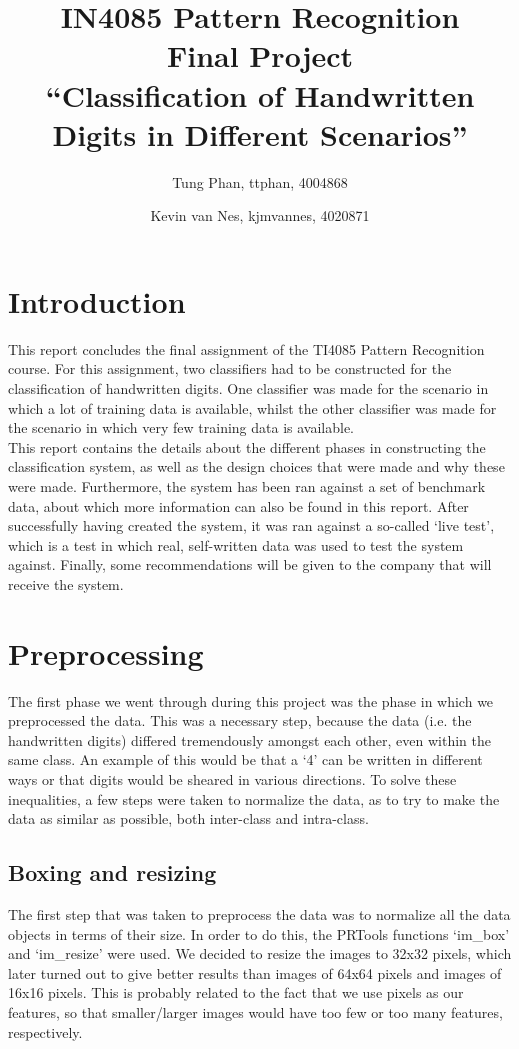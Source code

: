 \documentclass[11pt,twoside,a4paper]{article}
\title{
  IN4085 Pattern Recognition\\
  Final Project\\
  ``Classification of Handwritten Digits in Different Scenarios''
}
\author{
    Tung Phan, ttphan, 4004868 \and
    Kevin van Nes, kjmvannes, 4020871
}
\begin{document}
\maketitle

\section{Introduction}
This report concludes the final assignment of the TI4085 Pattern Recognition course. For this assignment, two classifiers had to be constructed for the classification of handwritten digits. One classifier was made for the scenario in which a lot of training data is available, whilst the other classifier was made for the scenario in which very few training data is available.\\
This report contains the details about the different phases in constructing the classification system, as well as the design choices that were made and why these were made. Furthermore, the system has been ran against a set of benchmark data, about which more information can also be found in this report. After successfully having created the system, it was ran against a so-called `live test', which is a test in which real, self-written data was used to test the system against. Finally, some recommendations will be given to the company that will receive the system.


\section{Preprocessing}
The first phase we went through during this project was the phase in which we preprocessed the data. This was a necessary step, because the data (i.e. the handwritten digits) differed tremendously amongst each other, even within the same class. An example of this would be that a `4' can be written in different ways or that digits would be sheared in various directions. To solve these inequalities, a few steps were taken to normalize the data, as to try to make the data as similar as possible, both inter-class and intra-class.

\subsection{Boxing and resizing}
The first step that was taken to preprocess the data was to normalize all the data objects in terms of their size. In order to do this, the PRTools functions `im\_box' and `im\_resize' were used. We decided to resize the images to 32x32 pixels, which later turned out to give better results than images of 64x64 pixels and images of 16x16 pixels. This is probably related to the fact that we use pixels as our features, so that smaller/larger images would have too few or too many features, respectively.
\end{document}
